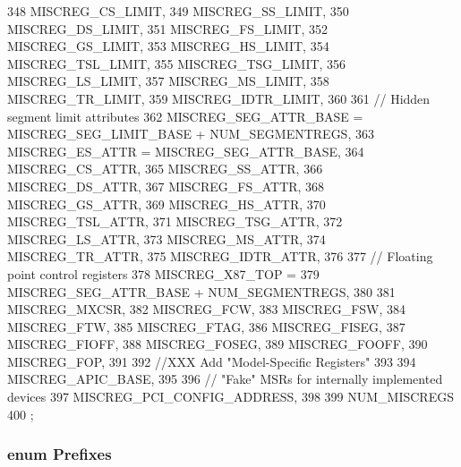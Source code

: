 \begin{DoxyCode}
{348         MISCREG_CS_LIMIT,
349         MISCREG_SS_LIMIT,
350         MISCREG_DS_LIMIT,
351         MISCREG_FS_LIMIT,
352         MISCREG_GS_LIMIT,
353         MISCREG_HS_LIMIT,
354         MISCREG_TSL_LIMIT,
355         MISCREG_TSG_LIMIT,
356         MISCREG_LS_LIMIT,
357         MISCREG_MS_LIMIT,
358         MISCREG_TR_LIMIT,
359         MISCREG_IDTR_LIMIT,
360 
361         // Hidden segment limit attributes
362         MISCREG_SEG_ATTR_BASE = MISCREG_SEG_LIMIT_BASE + NUM_SEGMENTREGS,
363         MISCREG_ES_ATTR = MISCREG_SEG_ATTR_BASE,
364         MISCREG_CS_ATTR,
365         MISCREG_SS_ATTR,
366         MISCREG_DS_ATTR,
367         MISCREG_FS_ATTR,
368         MISCREG_GS_ATTR,
369         MISCREG_HS_ATTR,
370         MISCREG_TSL_ATTR,
371         MISCREG_TSG_ATTR,
372         MISCREG_LS_ATTR,
373         MISCREG_MS_ATTR,
374         MISCREG_TR_ATTR,
375         MISCREG_IDTR_ATTR,
376 
377         // Floating point control registers
378         MISCREG_X87_TOP =
379             MISCREG_SEG_ATTR_BASE + NUM_SEGMENTREGS,
380 
381         MISCREG_MXCSR,
382         MISCREG_FCW,
383         MISCREG_FSW,
384         MISCREG_FTW,
385         MISCREG_FTAG,
386         MISCREG_FISEG,
387         MISCREG_FIOFF,
388         MISCREG_FOSEG,
389         MISCREG_FOOFF,
390         MISCREG_FOP,
391 
392         //XXX Add "Model-Specific Registers"
393 
394         MISCREG_APIC_BASE,
395 
396         // "Fake" MSRs for internally implemented devices
397         MISCREG_PCI_CONFIG_ADDRESS,
398 
399         NUM_MISCREGS
400     };
\end{DoxyCode}
\hypertarget{namespaceX86ISA_a9177933bdde69fdb102a2316ae38b2a3}{
\subsubsection[{Prefixes}]{\setlength{\rightskip}{0pt plus 5cm}enum {\bf Prefixes}}}
\label{namespaceX86ISA_a9177933bdde69fdb102a2316ae38b2a3}
